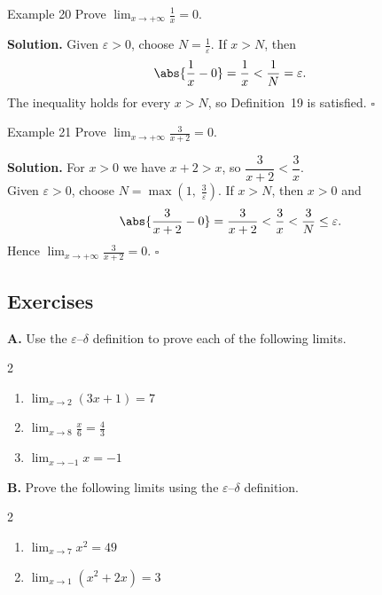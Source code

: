 \begin{examplebox}{Example 20}
Prove \(\displaystyle\lim_{x \to +\infty} \frac{1}{x} = 0\).

\medskip
\textbf{Solution.}
Given \(\varepsilon > 0\), choose \(N = \frac{1}{\varepsilon}\). If \(x > N\), then
\[
\abs{\frac{1}{x} - 0} = \frac{1}{x} < \frac{1}{N} = \varepsilon.
\]
The inequality holds for every \(x > N\), so Definition~19 is satisfied. \(\square\)
\end{examplebox}

\begin{examplebox}{Example 21}
Prove \(\displaystyle\lim_{x \to +\infty} \frac{3}{x+2} = 0\).

\medskip
\textbf{Solution.}
For \(x > 0\) we have \(x + 2 > x\), so
\(\dfrac{3}{x+2} < \dfrac{3}{x}.\) \\
Given \(\varepsilon > 0\), choose \(N = \max\!\left(1,\; \frac{3}{\varepsilon}\right)\). If \(x > N\), then \(x > 0\) and
\[
\abs{\frac{3}{x+2} - 0} = \frac{3}{x+2} < \frac{3}{x} < \frac{3}{N} \le \varepsilon.
\]
Hence \(\displaystyle\lim_{x \to +\infty} \frac{3}{x+2} = 0\). \(\square\)
\end{examplebox}



\subsection*{Exercises}
\label{subsec:1.4.7}

\raggedcolumns
\setlength{\columnsep}{1.5em}

\medskip
\noindent\textbf{A.} Use the \(\varepsilon\)--\(\delta\) definition to prove each of the following limits.

\begin{multicols}{2}
\begin{enumerate}[label=\arabic*., nosep, topsep=0pt, itemsep=2pt]
    \item \(\lim_{x \to 2} (3x + 1) = 7\)
    \item \(\lim_{x \to 8} \frac{x}{6} = \frac{4}{3}\)
    \item \(\lim_{x \to -1} x = -1\)
\end{enumerate}
\end{multicols}

\medskip
\noindent\textbf{B.} Prove the following limits using the \(\varepsilon\)--\(\delta\) definition.

\begin{multicols}{2}
\begin{enumerate}[label=\arabic*., start=4, nosep, topsep=0pt, itemsep=2pt]
    \item \(\lim_{x \to 7} x^{2} = 49\)
    \item \(\lim_{x \to 1} (x^{2} + 2x) = 3\)
\end{enumerate}
\end{multicols}

